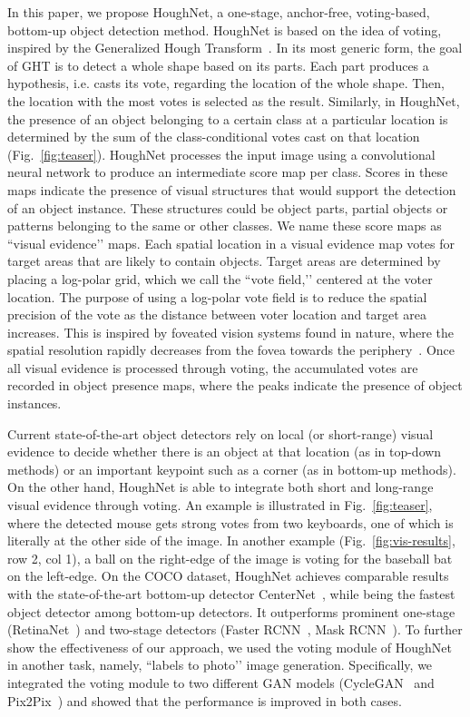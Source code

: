 \documentclass[runningheads]{llncs}
\begin{document}
In this paper, we propose HoughNet, a one-stage, anchor-free, voting-based, bottom-up object detection method. HoughNet is based on the idea of voting, inspired by the Generalized Hough Transform~\cite{hough1959,ght1981}. In its most generic form, the goal of GHT is to detect a whole shape based on its parts. Each part produces a hypothesis, i.e. casts its vote, regarding the location of the whole shape. Then, the location with the most votes is selected as the result. Similarly, in HoughNet,  the presence of an object belonging to a certain class at a particular location is determined by the sum of the class-conditional votes cast on that location (Fig.~\ref{fig:teaser}). HoughNet processes the input image using a convolutional neural network to produce an intermediate score map per class. Scores in these maps indicate the presence of visual structures that would support the detection of an object instance. These structures could be object parts, partial objects or patterns belonging to the same or other classes. We name these  score maps as ``visual evidence’’ maps. Each spatial location in a visual evidence map votes for target areas that are likely to contain objects. Target areas are determined by placing  a log-polar grid, which we call the ``vote field,’’ centered at the voter location. The purpose of using a log-polar vote field is to reduce the spatial precision of the vote as the distance between voter location and target area increases. This is inspired by foveated vision systems found in nature, where the spatial resolution rapidly decreases from the fovea towards the periphery~\cite{land2009looking}. Once all visual evidence is  processed through voting, the accumulated votes are recorded in object presence maps, where the peaks indicate the presence of object instances. 


Current state-of-the-art object detectors rely on local (or short-range) visual evidence to decide whether there is an object at that location (as in top-down methods) or an important keypoint such as a corner (as in bottom-up methods). On the other hand, HoughNet is able to integrate both short and long-range visual evidence through voting. An example is illustrated in Fig.~\ref{fig:teaser}, where the detected mouse gets strong votes from two keyboards, one of which is literally at the other side of the image. In another example (Fig.~\ref{fig:vis-results}, row 2, col 1), a ball on the right-edge of the image is voting for the baseball bat on the left-edge.  On the COCO  dataset, HoughNet achieves comparable results with the state-of-the-art bottom-up detector CenterNet~\cite{centernet2}, while being the fastest object detector among bottom-up detectors. It outperforms prominent one-stage (RetinaNet~\cite{retinanet}) and two-stage detectors (Faster RCNN~\cite{faster}, Mask RCNN~\cite{mask}).  To further show the effectiveness of our approach, we used the voting module of HoughNet in another task, namely, ``labels to photo’’ image generation. Specifically, we integrated the voting module to two different GAN models (CycleGAN~\cite{cyclegan} and Pix2Pix~\cite{pix2pix}) and showed that the performance is improved in both cases. 
\end{document}
